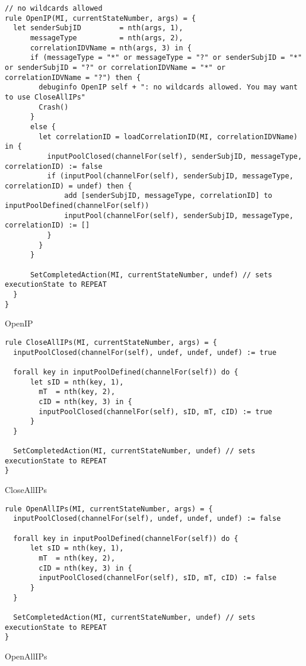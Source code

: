 \begin{listing}[H]
\begin{verbatim}
// no wildcards allowed
rule OpenIP(MI, currentStateNumber, args) = {
  let senderSubjID         = nth(args, 1),
      messageType          = nth(args, 2),
      correlationIDVName = nth(args, 3) in {
      if (messageType = "*" or messageType = "?" or senderSubjID = "*" or senderSubjID = "?" or correlationIDVName = "*" or correlationIDVName = "?") then {
        debuginfo OpenIP self + ": no wildcards allowed. You may want to use CloseAllIPs"
        Crash()
      }
      else {
        let correlationID = loadCorrelationID(MI, correlationIDVName) in {
          inputPoolClosed(channelFor(self), senderSubjID, messageType, correlationID) := false
          if (inputPool(channelFor(self), senderSubjID, messageType, correlationID) = undef) then {
              add [senderSubjID, messageType, correlationID] to inputPoolDefined(channelFor(self))
              inputPool(channelFor(self), senderSubjID, messageType, correlationID) := []
          }
        }
      }

      SetCompletedAction(MI, currentStateNumber, undef) // sets executionState to REPEAT
  }
}
\end{verbatim}
\caption{OpenIP}
\label{lst:asm:OpenIP}
\end{listing}




\begin{listing}[H]
\begin{verbatim}
rule CloseAllIPs(MI, currentStateNumber, args) = {
  inputPoolClosed(channelFor(self), undef, undef, undef) := true

  forall key in inputPoolDefined(channelFor(self)) do {
      let sID = nth(key, 1),
        mT  = nth(key, 2),
        cID = nth(key, 3) in {
        inputPoolClosed(channelFor(self), sID, mT, cID) := true
      }
  }

  SetCompletedAction(MI, currentStateNumber, undef) // sets executionState to REPEAT
}
\end{verbatim}
\caption{CloseAllIPs}
\label{lst:asm:CloseAllIPs}
\end{listing}




\begin{listing}[H]
\begin{verbatim}
rule OpenAllIPs(MI, currentStateNumber, args) = {
  inputPoolClosed(channelFor(self), undef, undef, undef) := false

  forall key in inputPoolDefined(channelFor(self)) do {
      let sID = nth(key, 1),
        mT  = nth(key, 2),
        cID = nth(key, 3) in {
        inputPoolClosed(channelFor(self), sID, mT, cID) := false
      }
  }

  SetCompletedAction(MI, currentStateNumber, undef) // sets executionState to REPEAT
}
\end{verbatim}
\caption{OpenAllIPs}
\label{lst:asm:OpenAllIPs}
\end{listing}




